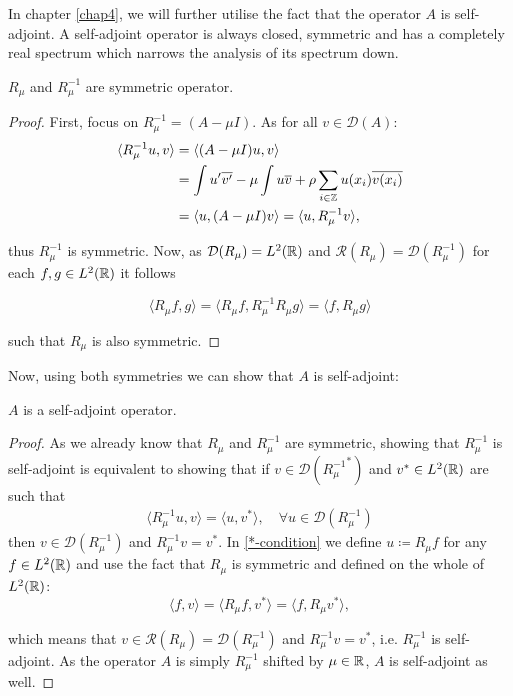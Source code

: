 In chapter \ref{chap4}, we will further utilise the fact that the operator $A$ is self-adjoint. A self-adjoint operator is always closed, symmetric and has a completely real spectrum which narrows the analysis of its spectrum down. 

\begin{theorem} \label{2.2:thm-RmuSymmetric}
	$R_{\mu}$ and $R_{\mu}^{-1}$ are symmetric operator.
	
	\begin{proof}
		First, focus on $R_{\mu}^{-1} = (A - \mu I)$. As for all $v \in \mathcal{D}(A)$:
			\begin{align*}
				\langle R_{\mu}^{-1} u, v \rangle & = \langle (A - \mu I) u, v \rangle \\
					& = \int u'\overline{v'} -  \mu \int u \overline{v} + \rho \sum_{i \in \mathbb{Z}} u(x_{i}) \overline{v(x_{i})} \\
					& = \langle u, (A - \mu I) v \rangle = \langle u,  R_{\mu}^{-1} v \rangle,
			\end{align*}

		thus $R_{\mu}^{-1}$ is symmetric. Now, as $\mathcal{D}(R_{\mu}) = L^{2}(\mathbb{R})$ and $\mathcal{R}(R_{\mu}) = \mathcal{D}(R_{\mu}^{-1})$ for each $f, g \in L^{2}(\mathbb{R})$ it follows
		
		\[  \langle R_{\mu} f, g \rangle =  \langle R_{\mu} f, R_{\mu}^{-1} R_{\mu} g \rangle = \langle f, R_{\mu} g \rangle \]
		
		such that $R_{\mu}$ is also symmetric.
	\end{proof}
\end{theorem}

Now, using both symmetries we can show that $A$ is self-adjoint:

\begin{theorem} \label{2.3:thm-ASelfAdjoint}
	$A$ is a self-adjoint operator.
		
	\begin{proof}
		As we already know that $R_{\mu}$ and $R_{\mu}^{-1}$ are symmetric, showing that $R_{\mu}^{-1}$ is self-adjoint is equivalent to showing that if $v \in \mathcal{D}({R_{\mu}^{-1}}^{*})$ and $v^{*} \in L^{2}(\mathbb{R})$ are such that
		\begin{align}
			\langle R_{\mu}^{-1} u, v \rangle = \langle u, v^{*} \rangle, \quad \forall u \in \mathcal{D}(R_{\mu}^{-1}) \label{*-condition}
		\end{align}
		then $v \in \mathcal{D}(R_{\mu}^{-1})$ and $R_{\mu}^{-1} v = v^{*}$.
		In \eqref{*-condition} we define $u \coloneqq R_{\mu} f$ for any $f \in L^{2}(\mathbb{R})$ and use the fact that $R_{\mu}$ is symmetric and defined on the whole of $L^{2}(\mathbb{R})$:
		\[  \langle f, v \rangle = \langle R_{\mu} f, v^{*} \rangle = \langle f, R_{\mu} v^{*} \rangle, \]
		
		which means that $v \in \mathcal{R}(R_{\mu}) = \mathcal{D}(R_{\mu}^{-1})$ and $R_{\mu}^{-1} v = v^{*}$, i.e. $R_{\mu}^{-1}$ is self-adjoint. As the operator $A$ is simply $R_{\mu}^{-1}$ shifted by $\mu \in \mathbb{R}$, $A$ is self-adjoint as well.		
	\end{proof}
\end{theorem}